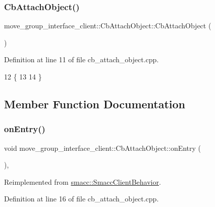 \subsubsection{\texorpdfstring{Cb\+Attach\+Object()}{CbAttachObject()}\hspace{0.1cm}{\footnotesize\ttfamily [2/2]}}
{\footnotesize\ttfamily move\+\_\+group\+\_\+interface\+\_\+client\+::\+Cb\+Attach\+Object\+::\+Cb\+Attach\+Object (\begin{DoxyParamCaption}{ }\end{DoxyParamCaption})}



Definition at line 11 of file cb\+\_\+attach\+\_\+object.\+cpp.


\begin{DoxyCode}
12     \{
13         
14     \}
\end{DoxyCode}


\subsection{Member Function Documentation}
\mbox{\label{classmove__group__interface__client_1_1CbAttachObject_a85ddd1ee5d0057fe489de10007982f22}} 
\subsubsection{\texorpdfstring{on\+Entry()}{onEntry()}}
{\footnotesize\ttfamily void move\+\_\+group\+\_\+interface\+\_\+client\+::\+Cb\+Attach\+Object\+::on\+Entry (\begin{DoxyParamCaption}{ }\end{DoxyParamCaption})\hspace{0.3cm}{\ttfamily [override]}, {\ttfamily [virtual]}}



Reimplemented from \hyperlink{classsmacc_1_1SmaccClientBehavior_ad5d3e1f1697c3cfe66c94cadba948493}{smacc\+::\+Smacc\+Client\+Behavior}.



Definition at line 16 of file cb\+\_\+attach\+\_\+object.\+cpp.



